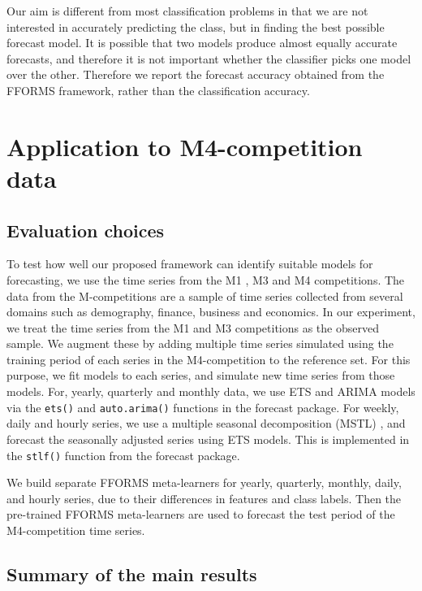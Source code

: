 \documentclass[11pt,a4paper,]{article}
\begin{document}
Our aim is different from most classification problems in that we are not interested in accurately predicting the class, but in finding the best possible forecast model. It is possible that two models produce almost equally accurate forecasts, and therefore it is not important whether the classifier picks one model over the other. Therefore we report the forecast accuracy obtained from the FFORMS framework, rather than the classification accuracy.

\hypertarget{results}{%
\section{Application to M4-competition data}\label{results}}

\hypertarget{evaluation-choices}{%
\subsection{Evaluation choices}\label{evaluation-choices}}

To test how well our proposed framework can identify suitable models for forecasting, we use the time series from the M1 \autocite{makridakis1982accuracy}, M3 \autocite{makridakis2000m3} and M4 \autocite{makridakis2019m4} competitions. The data from the M-competitions are a sample of time series collected from several domains such as demography, finance, business and economics. In our experiment, we treat the time series from the M1 and M3 competitions as the observed sample. We augment these by adding multiple time series simulated using the training period of each series in the M4-competition to the reference set. For this purpose, we fit models to each series, and simulate new time series from those models. For, yearly, quarterly and monthly data, we use ETS and ARIMA models via the \texttt{ets()} and \texttt{auto.arima()} functions in the forecast package. For weekly, daily and hourly series, we use a multiple seasonal decomposition (MSTL) \autocite{bandara2021mstl}, and forecast the seasonally adjusted series using ETS models. This is implemented in the \texttt{stlf()} function from the forecast package.

We build separate FFORMS meta-learners for yearly, quarterly, monthly, daily, and hourly series, due to their differences in features and class labels. Then the pre-trained FFORMS meta-learners are used to forecast the test period of the M4-competition time series.

\hypertarget{summary-of-the-main-results}{%
\subsection{Summary of the main results}\label{summary-of-the-main-results}}
\end{document}
